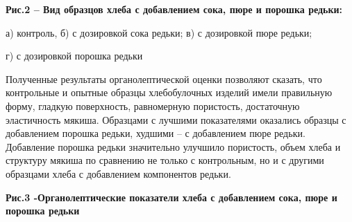 



{\bfseries Рис.2 -- Вид образцов хлеба с добавлением сока, пюре и порошка
редьки:}

а) контроль, б) с дозировкой сока редьки; в) с дозировкой пюре редьки;

г) с дозировкой порошка редьки

Полученные результаты органолептической оценки позволяют сказать, что
контрольные и опытные образцы хлебобулочных изделий имели правильную
форму, гладкую поверхность, равномерную пористость, достаточную
эластичность мякиша. Образцами с лучшими показателями оказались образцы
с добавлением порошка редьки, худшими -- с добавлением пюре редьки.
Добавление порошка редьки значительно улучшило пористость, объем хлеба и
структуру мякиша по сравнению не только с контрольным, но и с другими
образцами хлеба с добавлением компонентов редьки.

{\bfseries Рис.3 -Органолептические показатели хлеба с добавлением сока,
пюре и порошка редьки}

